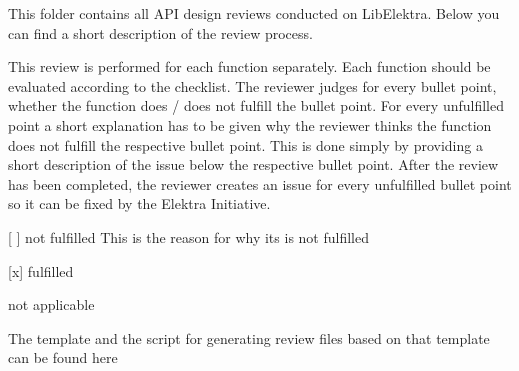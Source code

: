 This folder contains all A\+PI design reviews conducted on Lib\+Elektra. Below you can find a short description of the review process.

This review is performed for each function separately. Each function should be evaluated according to the checklist. The reviewer judges for every bullet point, whether the function does / does not fulfill the bullet point. For every unfulfilled point a short explanation has to be given why the reviewer thinks the function does not fulfill the respective bullet point. This is done simply by providing a short description of the issue below the respective bullet point. After the review has been completed, the reviewer creates an issue for every unfulfilled bullet point so it can be fixed by the Elektra Initiative.


\begin{DoxyItemize}
\item \mbox{[} \mbox{]} not fulfilled This is the reason for why its is not fulfilled
\item \mbox{[}x\mbox{]} fulfilled
\item not applicable
\end{DoxyItemize}

The template and the script for generating review files based on that template can be found here 